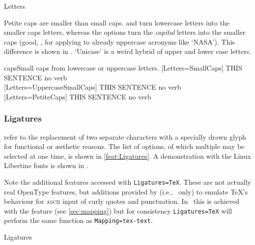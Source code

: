 \documentclass[a4paper]{l3doc}
\begin{document}
\begin{features}{Letters}
\end{features}

Petite caps are smaller than small caps.
 and 
turn lowercase letters into the smaller caps letters,
whereas the  options turn the \emph{capital} letters into
the smaller
caps (good, \eg, for applying to already uppercase acronyms like
`NASA').
This difference is shown in .
`Unicase' is a weird hybrid of upper and lower case letters.

\begin{Lexample}{caps}{Small caps from lowercase or uppercase letters.}
  [Letters=SmallCaps]
   THIS SENTENCE no verb                \\
  [Letters=UppercaseSmallCaps]
   THIS SENTENCE no verb                \\
  [Letters=PetiteCaps]
   THIS SENTENCE no verb
\end{Lexample}



\subsubsection{Ligatures}
\label{sec:ot-feat-liga}

 refer to the replacement of two separate characters
with a specially drawn glyph for functional or \ae sthetic reasons.
The list of options, of which multiple may be selected at one time,
is shown in \ref{feat:Ligatures}.
A demonstration with the Linux Libertine fonts is shown in .

Note the additional features accessed with \verb|Ligatures=TeX|. These are
not actually real OpenType features, but additions provided by  (i.e., \LuaTeX\ only) to emulate \TeX's behaviour for \textsc{ascii} input of curly quotes and punctuation. In \XeTeX\ this is achieved with the  feature (see \vref{sec:mapping}) but for consistency \verb|Ligatures=TeX| will perform the same function as \verb|Mapping=tex-text|.

\begin{features}{Ligatures}
\end{features}
\end{document}
